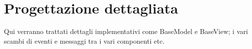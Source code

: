 \section{Progettazione dettagliata}\label{sec:Progettazione}
Qui verranno trattati dettagli implementativi come BaseModel e BaseView; i vari scambi di eventi
e messaggi tra i vari componenti etc.

 \newpage